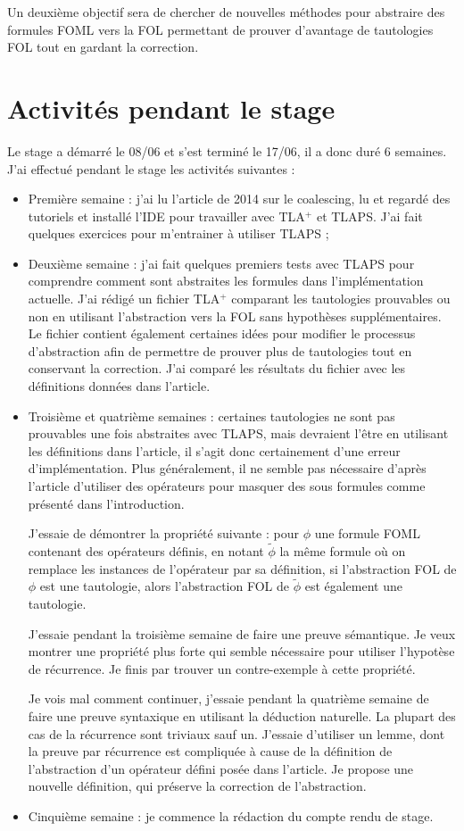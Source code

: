 \documentclass[12pt]{article}
\begin{document}
Un deuxième objectif sera de chercher de nouvelles méthodes pour abstraire des formules FOML vers la FOL permettant de prouver d'avantage de tautologies FOL tout en gardant la correction.

\section{Activités pendant le stage}

Le stage a démarré le 08/06 et s'est terminé le 17/06, il a donc duré 6 semaines.
J'ai effectué pendant le stage les activités suivantes :
\begin{itemize}
\item
  Première semaine :
  j'ai lu l'article de 2014 sur le coalescing, lu et regardé des tutoriels et installé l'IDE pour travailler avec TLA$^+$ et TLAPS. J'ai fait quelques exercices pour m'entrainer à utiliser TLAPS ;
\item
  Deuxième semaine :
  j'ai fait quelques premiers tests avec TLAPS pour comprendre comment sont abstraites les formules dans l'implémentation actuelle.
  J'ai rédigé un fichier TLA$^+$ comparant les tautologies prouvables ou non en utilisant l'abstraction vers la FOL sans hypothèses supplémentaires.
  Le fichier contient également certaines idées pour modifier le processus d'abstraction afin de permettre de prouver plus de tautologies tout en conservant la correction.
  J'ai comparé les résultats du fichier avec les définitions données dans l'article.
\item
  Troisième et quatrième semaines :
  certaines tautologies ne sont pas prouvables une fois abstraites avec TLAPS, mais devraient l'être en utilisant les définitions dans l'article, il s'agit donc certainement d'une erreur d'implémentation.
  Plus généralement, il ne semble pas nécessaire d'après l'article d'utiliser des opérateurs pour masquer des sous formules comme présenté dans l'introduction.
  
  J'essaie de démontrer la propriété suivante : pour $\phi$ une formule FOML contenant des opérateurs définis, en notant $\widetilde{\phi}$ la même formule où on remplace les instances de l'opérateur par sa définition, si l'abstraction FOL de $\phi$ est une tautologie, alors l'abstraction FOL de $\widetilde{\phi}$ est également une tautologie.

  J'essaie pendant la troisième semaine de faire une preuve sémantique.
  Je veux montrer une propriété plus forte qui semble nécessaire pour utiliser l'hypotèse de récurrence.
  Je finis par trouver un contre-exemple à cette propriété.

  Je vois mal comment continuer, j'essaie pendant la quatrième semaine de faire une preuve syntaxique en utilisant la déduction naturelle.
  La plupart des cas de la récurrence sont triviaux sauf un.
  J'essaie d'utiliser un lemme, dont la preuve par récurrence est compliquée à cause de la définition de l'abstraction d'un opérateur défini posée dans l'article.
  Je propose une nouvelle définition, qui préserve la correction de l'abstraction.
\item
  Cinquième semaine :
  je commence la rédaction du compte rendu de stage.
\end{itemize}
\end{document}
